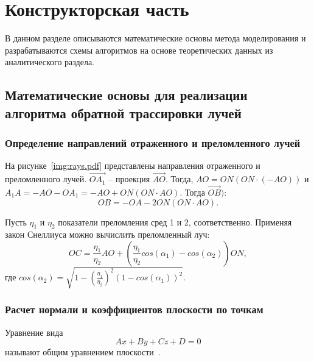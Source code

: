 \section{Конструкторская часть}
В данном разделе описываются математические основы метода моделирования и разрабатываются схемы алгоритмов на основе теоретических данных из аналитического раздела.

\subsection{Математические основы для реализации алгоритма обратной трассировки лучей}

\subsubsection{Определение направлений отраженного и преломленного лучей}
На рисунке~\ref{img:rays.pdf} представлены направления отраженного и преломленного лучей.
$\overrightarrow{OA_1}$ -- проекция $\overrightarrow{AO}$. Тогда, $AO = ON(ON\cdot(-AO))$ и $A_1A = -AO-OA_1 = -AO+ON(ON\cdot AO)$.
Тогда $\overrightarrow{OB})$:
\begin{equation}
	OB = -OA -2 ON(ON\cdot AO).
\end{equation}

Пусть $\eta_{1}$ и $\eta_{2}$ показатели преломления сред 1 и 2, соответственно. Применяя закон Снеллиуса можно вычислить преломленный луч:
\begin{equation}
	OC = \frac{\eta_{1}}{\eta_{2}}AO + (\frac{\eta_{1}}{\eta_{2}} cos(\alpha_1) - cos(\alpha_2)) ON,
\end{equation}
где $cos(\alpha_2) = \sqrt{1 -   (\frac{\eta_{1}}{\eta_{2}}) ^ 2 (1 - cos(\alpha_1))^2  }$.


\subsubsection{Расчет нормали и коэффициентов плоскости по точкам}
Уравнение вида 
\begin{equation}
	Ax + By + Cz + D = 0
\end{equation}
называют общим уравнением плоскости~\cite{angeom}.

